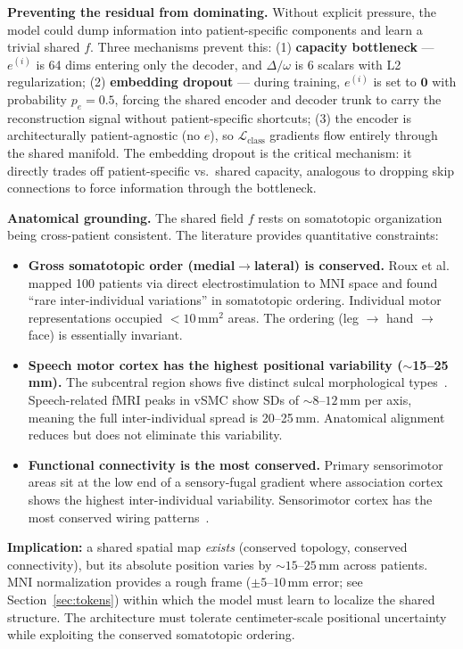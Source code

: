 \documentclass[11pt,letterpaper]{article}
\begin{document}
\textbf{Preventing the residual from dominating.} Without explicit pressure, the model could dump information into patient-specific components and learn a trivial shared $f$. Three mechanisms prevent this: (1) \textbf{capacity bottleneck} --- $e^{(i)}$ is 64 dims entering only the decoder, and $\Delta/\omega$ is 6 scalars with L2 regularization; (2) \textbf{embedding dropout} --- during training, $e^{(i)}$ is set to $\mathbf{0}$ with probability $p_e = 0.5$, forcing the shared encoder and decoder trunk to carry the reconstruction signal without patient-specific shortcuts; (3) the encoder is architecturally patient-agnostic (no $e$), so $\mathcal{L}_{\text{class}}$ gradients flow entirely through the shared manifold. The embedding dropout is the critical mechanism: it directly trades off patient-specific vs.\ shared capacity, analogous to dropping skip connections to force information through the bottleneck.

\textbf{Anatomical grounding.} The shared field $f$ rests on somatotopic organization being cross-patient consistent. The literature provides quantitative constraints:

\begin{itemize}[leftmargin=2em]
\item \textbf{Gross somatotopic order (medial$\to$lateral) is conserved.} Roux et al.~\cite{roux2020} mapped 100 patients via direct electrostimulation to MNI space and found ``rare inter-individual variations'' in somatotopic ordering. Individual motor representations occupied $< 10$\,mm$^2$ areas. The ordering (leg $\to$ hand $\to$ face) is essentially invariant.
\item \textbf{Speech motor cortex has the highest positional variability (${\sim}$15--25\,mm).} The subcentral region shows five distinct sulcal morphological types~\cite{eichert2020}. Speech-related fMRI peaks in vSMC show SDs of ${\sim}8$--$12$\,mm per axis, meaning the full inter-individual spread is 20--25\,mm. Anatomical alignment reduces but does not eliminate this variability.
\item \textbf{Functional connectivity is the most conserved.} Primary sensorimotor areas sit at the low end of a sensory-fugal gradient where association cortex shows the highest inter-individual variability. Sensorimotor cortex has the most conserved wiring patterns~\cite{mueller2013}.
\end{itemize}

\textbf{Implication:} a shared spatial map \textit{exists} (conserved topology, conserved connectivity), but its absolute position varies by ${\sim}15$--$25$\,mm across patients. MNI normalization provides a rough frame ($\pm 5$--$10$\,mm error; see Section~\ref{sec:tokens}) within which the model must learn to localize the shared structure. The architecture must tolerate centimeter-scale positional uncertainty while exploiting the conserved somatotopic ordering.
\end{document}
